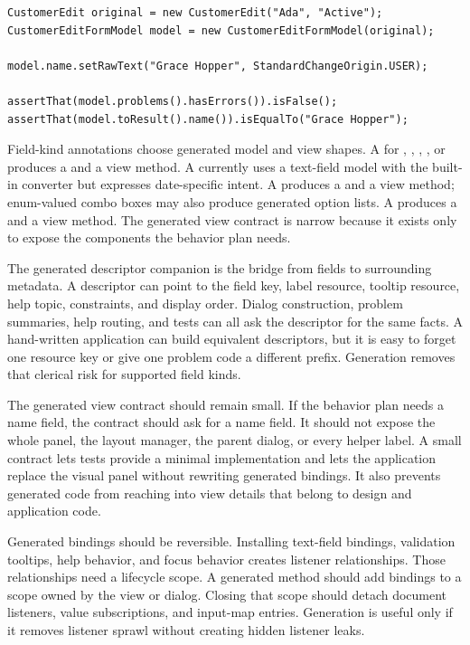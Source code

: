 \begin{lstlisting}[caption={Using a generated form model without Swing.}]
CustomerEdit original = new CustomerEdit("Ada", "Active");
CustomerEditFormModel model = new CustomerEditFormModel(original);

model.name.setRawText("Grace Hopper", StandardChangeOrigin.USER);

assertThat(model.problems().hasErrors()).isFalse();
assertThat(model.toResult().name()).isEqualTo("Grace Hopper");
\end{lstlisting}

Field-kind annotations choose generated model and view shapes. A
 for , , ,
, or  produces a  and a
 view method. A  currently uses a text-field
model with the built-in  converter but expresses date-specific
intent. A  produces a  and a
 view method; enum-valued combo boxes may also produce
generated option lists. A  produces a  and a
 view method. The generated view contract is narrow because it
exists only to expose the components the behavior plan needs.

The generated descriptor companion is the bridge from fields to surrounding
metadata. A descriptor can point to the field key, label resource, tooltip
resource, help topic, constraints, and display order. Dialog construction,
problem summaries, help routing, and tests can all ask the descriptor for the
same facts. A hand-written application can build equivalent descriptors, but
it is easy to forget one resource key or give one problem code a different
prefix. Generation removes that clerical risk for supported field kinds.

The generated view contract should remain small. If the behavior plan needs a
name field, the contract should ask for a name field. It should not expose the
whole panel, the layout manager, the parent dialog, or every helper label. A
small contract lets tests provide a minimal implementation and lets the
application replace the visual panel without rewriting generated bindings. It
also prevents generated code from reaching into view details that belong to
design and application code.

Generated bindings should be reversible. Installing text-field bindings,
validation tooltips, help behavior, and focus behavior creates listener
relationships. Those relationships need a lifecycle scope. A generated
 method should add bindings to a scope
owned by the view or dialog. Closing that scope should detach document
listeners, value subscriptions, and input-map entries. Generation is useful
only if it removes listener sprawl without creating hidden listener leaks.

